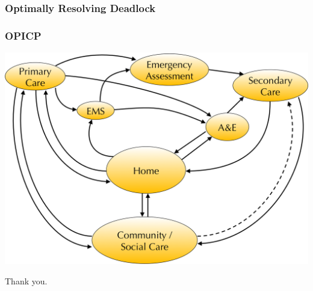 \documentclass[xcolor={table}]{beamer}
\begin{document}
\begin{frame}
    \frametitle{Optimally Resolving Deadlock}
    \begin{figure}
        
    \end{figure}
\end{frame}

\begin{frame}
    \frametitle{OPICP}
    \begin{center}
        \includegraphics[width=\textwidth]{opicp_concept}
    \end{center}
\end{frame}

\begin{frame}
    \begin{center}
        \huge{Thank you.}
    \end{center}
\end{frame}
\end{document}
